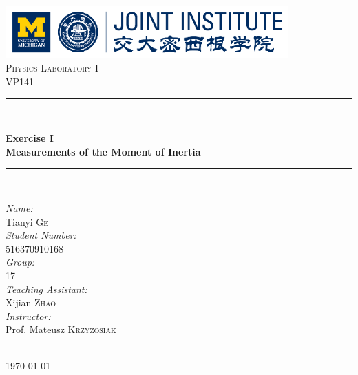\begin{titlepage}

\newcommand{\HRule}{\rule{\linewidth}{0.5mm}}

\center

\includegraphics[height=0.8in]{images/logo.png}\\[1cm]

\textsc{\Large Physics Laboratory I}\\[0.4cm]
\textsc{\large VP141}\\[0.4cm]

\HRule \\[0.4cm]
{
    \bfseries
    {\huge Exercise I}\\[0.3cm]
    {\large Measurements of the Moment of Inertia}\\[0.2cm]
    \HRule \\[1.5cm]
}

\begin{minipage}{0.4\textwidth}

\large
\emph{Name:}\\
Tianyi \textsc{Ge} \\

\emph{Student Number:}\\
516370910168 \\

\emph{Group:}\\
17\\

\emph{Teaching Assistant:}\\
Xijian \textsc{Zhao}\\

\emph{Instructor:}\\
Prof. Mateusz \textsc{Krzyzosiak}

\end{minipage}\\[2cm]

{\large \today}\\[2cm]

\vfill

\end{titlepage}


\tableofcontents
\clearpage